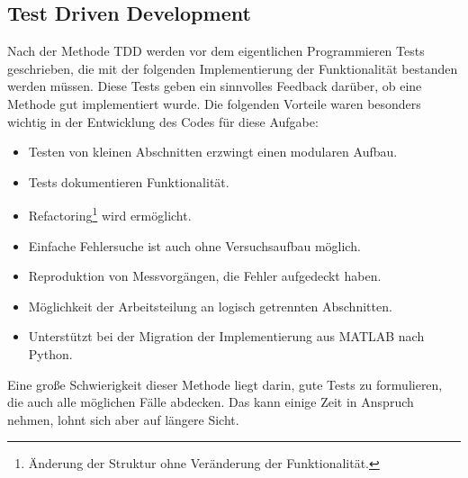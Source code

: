 \documentclass[../Report.tex]{subfiles}
\begin{document}
\subsection{Test Driven Development}
\label{subsec:code.tdd}
Nach der Methode TDD werden vor dem eigentlichen Programmieren Tests geschrieben, die mit der folgenden Implementierung der Funktionalität bestanden werden müssen. Diese Tests geben ein sinnvolles Feedback darüber, ob eine Methode gut implementiert wurde. Die folgenden Vorteile waren besonders wichtig in der Entwicklung des Codes für diese Aufgabe:
\begin{itemize}
	\item Testen von kleinen Abschnitten erzwingt einen modularen Aufbau.
	\item Tests dokumentieren Funktionalität.
	\item Refactoring\footnote{Änderung der Struktur ohne Veränderung der Funktionalität.} wird ermöglicht.
	\item Einfache Fehlersuche ist auch ohne Versuchsaufbau möglich.
	\item Reproduktion von Messvorgängen, die Fehler aufgedeckt haben.
	\item Möglichkeit der Arbeitsteilung an logisch getrennten Abschnitten.
	\item Unterstützt bei der Migration der Implementierung aus MATLAB nach Python.
\end{itemize}
Eine große Schwierigkeit dieser Methode liegt darin, gute Tests zu formulieren, die auch alle möglichen Fälle abdecken. Das kann einige Zeit in Anspruch nehmen, lohnt sich aber auf längere Sicht.
\end{document}
